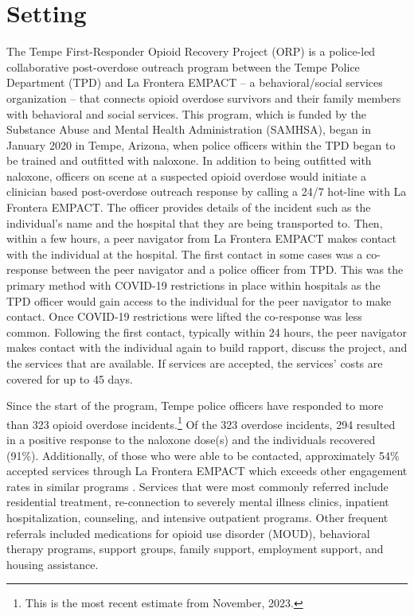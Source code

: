 \section{\centering Setting}

The Tempe First-Responder Opioid Recovery Project (ORP) is a police-led collaborative post-overdose outreach program between the Tempe Police Department (TPD) and La Frontera EMPACT -- a behavioral/social services organization -- that connects opioid overdose survivors and their family members with behavioral and social services. This program, which is funded by the Substance Abuse and Mental Health Administration (SAMHSA), began in January 2020 in Tempe, Arizona, when police officers within the TPD began to be trained and outfitted with naloxone. In addition to being outfitted with naloxone, officers on scene at a suspected opioid overdose would initiate a clinician based post-overdose outreach response by calling a 24/7 hot-line with La Frontera EMPACT. The officer provides details of the incident such as the individual's name and the hospital that they are being transported to. Then, within a few hours, a peer navigator from La Frontera EMPACT makes contact with the individual at the hospital. The first contact in some cases was a co-response between the peer navigator and a police officer from TPD. This was the primary method with COVID-19 restrictions in place within hospitals as the TPD officer would gain access to the individual for the peer navigator to make contact. Once COVID-19 restrictions were lifted the co-response was less common. Following the first contact, typically within 24 hours, the peer navigator makes contact with the individual again to build rapport, discuss the project, and the services that are available. If services are accepted, the services' costs are covered for up to 45 days. 

Since the start of the program, Tempe police officers have responded to more than 323 opioid overdose incidents.\footnote{This is the most recent estimate from November, 2023.} Of the 323 overdose incidents, 294 resulted in a positive response to the naloxone dose(s) and the individuals recovered (91\%). Additionally, of those who were able to be contacted, approximately 54\% accepted services through La Frontera EMPACT which exceeds other engagement rates in similar programs \parencite{dahlem_recovery_2021, wagner_training_2016}. Services that were most commonly referred include residential treatment, re-connection to severely mental illness clinics, inpatient hospitalization, counseling, and intensive outpatient programs. Other frequent referrals included medications for opioid use disorder (MOUD), behavioral therapy programs, support groups, family support, employment support, and housing assistance.

